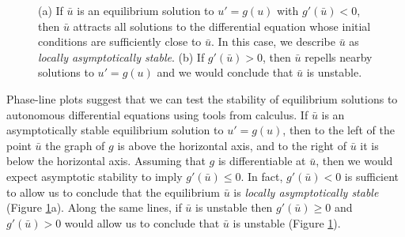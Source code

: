 \documentclass[../book.tex]{subfiles}
\begin{document}
\begin{figure}[htbp]
  \centering
  \hspace{0.35in}
  
  \caption{(a) If \(\bar u\) is an equilibrium solution to \(u' = g(u)\) with \(g'(\bar u) < 0\), then \(\bar u\) attracts all solutions to the differential equation whose initial conditions are sufficiently close to \(\bar u\). In this case, we describe \(\bar u\) as {\it locally asymptotically stable}. (b) If \(g'(\bar u) >0\), then \(\bar u\) repells nearby solutions to \(u'=g(u)\) and we would conclude that \(\bar u\) is unstable.} 
  \label{fig:phase} 
\end{figure}

Phase-line plots suggest that we can test the stability of equilibrium solutions to autonomous differential equations using tools from calculus. If \(\bar u\) is an asymptotically stable equilibrium solution to \(u' = g(u)\), then to the left of the point \(\bar u\) the graph of \(g\) is above the horizontal axis, and to the right of \(\bar u\) it is below the horizontal axis. Assuming that \(g\) is differentiable at \(\bar u\), then we would expect asymptotic stability to imply \(g'(\bar u) \leq 0\). In fact, \(g'(\bar u) < 0\) is sufficient to allow us to conclude that the equilibrium \(\bar u\) is {\it locally asymptotically stable} (Figure \ref{fig:phase}a). Along the same lines, if \(\bar u\) is unstable then \(g'(\bar u) \geq 0\) and \(g'(\bar u) > 0\) would allow us to conclude that \(\bar u\) is unstable (Figure \ref{fig:phase}).
\end{document}
